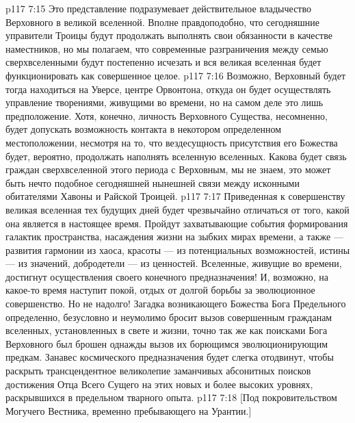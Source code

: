 \vs p117 7:15 Это представление подразумевает действительное владычество Верховного в великой вселенной. Вполне правдоподобно, что сегодняшние управители Троицы будут продолжать выполнять свои обязанности в качестве наместников, но мы полагаем, что современные разграничения между семью сверхвселенными будут постепенно исчезать и вся великая вселенная будет функционировать как совершенное целое.
\vs p117 7:16 Возможно, Верховный будет тогда находиться на Уверсе, центре Орвонтона, откуда он будет осуществлять управление творениями, живущими во времени, но на самом деле это лишь предположение. Хотя, конечно, личность Верховного Существа, несомненно, будет допускать возможность контакта в некотором определенном местоположении, несмотря на то, что вездесущность присутствия его Божества будет, вероятно, продолжать наполнять вселенную вселенных. Какова будет связь граждан сверхвселенной этого периода с Верховным, мы не знаем, это может быть нечто подобное сегодняшней нынешней связи между исконными обитателями Хавоны и Райской Троицей.
\vs p117 7:17 \pc Приведенная к совершенству великая вселенная тех будущих дней будет чрезвычайно отличаться от того, какой она является в настоящее время. Пройдут захватывающие события формирования галактик пространства, насаждения жизни на зыбких мирах времени, а также --- развития гармонии из хаоса, красоты --- из потенциальных возможностей, истины --- из значений, добродетели --- из ценностей. Вселенные, живущие во времени, достигнут осуществления своего конечного предназначения! И, возможно, на какое\hyp{}то время наступит покой, отдых от долгой борьбы за эволюционное совершенство. Но не надолго! Загадка возникающего Божества Бога Предельного определенно, безусловно и неумолимо бросит вызов совершенным гражданам вселенных, установленных в свете и жизни, точно так же как поисками Бога Верховного был брошен однажды вызов их борющимся эволюционирующим предкам. Занавес космического предназначения будет слегка отодвинут, чтобы раскрыть трансцендентное великолепие заманчивых абсонитных поисков достижения Отца Всего Сущего на этих новых и более высоких уровнях, раскрывшихся в предельном тварного опыта.
\vsetoff
\vs p117 7:18 [Под покровительством Могучего Вестника, временно пребывающего на Урантии.]
